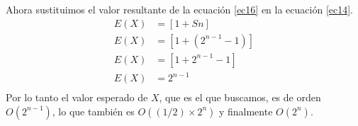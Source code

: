 \documentclass[12pt]{article}
\begin{document}
Ahora sustituimos el valor resultante de la ecuación \ref{ec16} en la ecuación \ref{ec14}.\\
\begin{equation}
\begin{split}
E(X) & =   [1 + Sn]\\
E(X) & =   [1 + (2^{n-1} - 1)]\\
E(X) & =   [1 + 2^{n-1} - 1]\\
E(X) & =   2^{n-1}\\
\end{split}
\end{equation}
Por lo tanto el valor esperado de $X$, que es el que buscamos, es de orden $O(2^{n-1})$, lo que también es $O((1/2) \times 2^{n})$ y finalmente $O(2^n)$.
\end{document}

